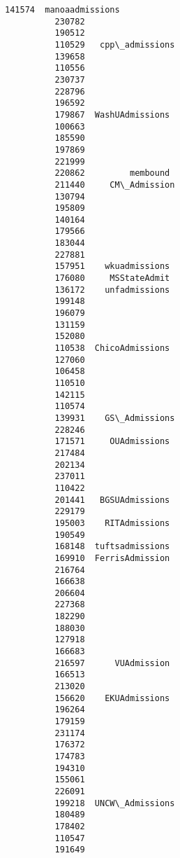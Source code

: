 \documentclass[11pt]{article}
\begin{document}
\begin{Verbatim}[commandchars=\\\{\}]
          141574  manoaadmissions  
          230782                   
          190512                   
          110529   cpp\_admissions  
          139658                   
          110556                   
          230737                   
          228796                   
          196592                   
          179867  WashUAdmissions  
          100663                   
          185590                   
          197869                   
          221999                   
          220862         membound  
          211440     CM\_Admission  
          130794                   
          195809                   
          140164                   
          179566                   
          183044                   
          227881                   
          157951    wkuadmissions  
          176080     MSStateAdmit  
          136172    unfadmissions  
          199148                   
          196079                   
          131159                   
          152080                   
          110538  ChicoAdmissions  
          127060                   
          106458                   
          110510                   
          142115                   
          110574                   
          139931    GS\_Admissions  
          228246                   
          171571     OUAdmissions  
          217484                   
          202134                   
          237011                   
          110422                   
          201441   BGSUAdmissions  
          229179                   
          195003    RITAdmissions  
          190549                   
          168148  tuftsadmissions  
          169910  FerrisAdmission  
          216764                   
          166638                   
          206604                   
          227368                   
          182290                   
          188030                   
          127918                   
          166683                   
          216597      VUAdmission  
          166513                   
          213020                   
          156620    EKUAdmissions  
          196264                   
          179159                   
          231174                   
          176372                   
          174783                   
          194310                   
          155061                   
          226091                   
          199218  UNCW\_Admissions  
          180489                   
          178402                   
          110547                   
          191649                   

\end{Verbatim}
\end{document}
